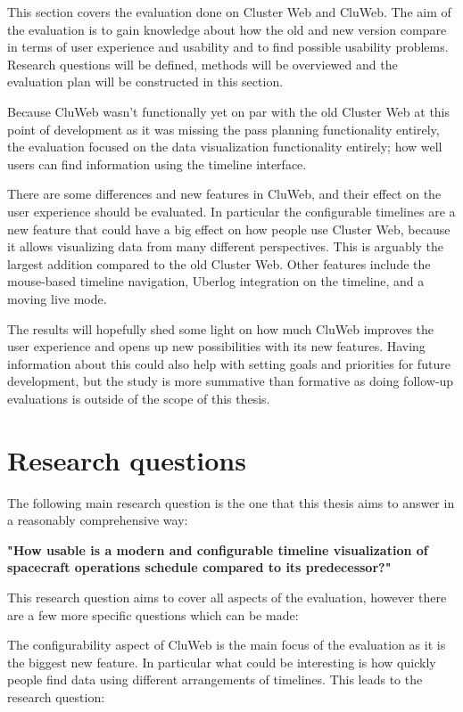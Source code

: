 
This section covers the evaluation done on Cluster Web and CluWeb. The aim of the evaluation is to gain knowledge about how the old and new version compare in terms of user experience and usability and to find possible usability problems. Research questions will be defined, methods will be overviewed and the evaluation plan will be constructed in this section.

Because CluWeb wasn't functionally yet on par with the old Cluster Web at this point of development as it was missing the pass planning functionality entirely, the evaluation focused on the data visualization functionality entirely; how well users can find information using the timeline interface.

There are some differences and new features in CluWeb, and their effect on the user experience should be evaluated. In particular the configurable timelines are a new feature that could have a big effect on how people use Cluster Web, because it allows visualizing data from many different perspectives. This is arguably the largest addition compared to the old Cluster Web. Other features include the mouse-based timeline navigation, Uberlog integration on the timeline, and a moving live mode.

The results will hopefully shed some light on how much CluWeb improves the user experience and opens up new possibilities with its new features. Having information about this could also help with setting goals and priorities for future development, but the study is more summative than formative as doing follow-up evaluations is outside of the scope of this thesis. \cite{albert2013measuring}

\section{Research questions} \label{research_questions}
The following main research question is the one that this thesis aims to answer in a reasonably comprehensive way:

\textbf{"How usable is a modern and configurable timeline visualization of spacecraft operations schedule compared to its predecessor?"}

This research question aims to cover all aspects of the evaluation, however there are a few more specific questions which can be made:

The configurability aspect of CluWeb is the main focus of the evaluation as it is the biggest new feature. In particular what could be interesting is how quickly people find data using different arrangements of timelines. This leads to the research question:

